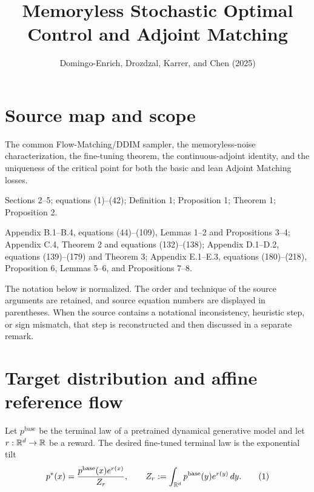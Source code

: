 
\title{Memoryless Stochastic Optimal Control and Adjoint Matching}
\author{}
\date{Domingo-Enrich, Drozdzal, Karrer, and Chen (2025)}

\maketitle

\section*{Source map and scope}
\begin{sourceguide}
\item[Primary source] {\scriptsize{}}
\item[Target results] The common Flow-Matching/DDIM sampler, the memoryless-noise characterization, the fine-tuning theorem, the continuous-adjoint identity, and the uniqueness of the critical point for both the basic and lean Adjoint Matching losses.
\item[Main-text anchors] Sections 2--5; equations (1)--(42); Definition 1; Proposition 1; Theorem 1; Proposition 2.
\item[Proof anchors] Appendix B.1--B.4, equations (44)--(109), Lemmas 1--2 and Propositions 3--4; Appendix C.4, Theorem 2 and equations (132)--(138); Appendix D.1--D.2, equations (139)--(179) and Theorem 3; Appendix E.1--E.3, equations (180)--(218), Proposition 6, Lemmas 5--6, and Propositions 7--8.
\end{sourceguide}

The notation below is normalized.  The order and technique of the source arguments are retained, and source equation numbers are displayed in parentheses.  When the source contains a notational inconsistency, heuristic step, or sign mismatch, that step is reconstructed and then discussed in a separate remark.

\section{Target distribution and affine reference flow}

Let $p^{\mathrm{base}}$ be the terminal law of a pretrained dynamical generative model and let $r:\mathbb{R}^d\to\mathbb{R}$ be a reward.  The desired fine-tuned terminal law is the exponential tilt
\begin{equation*}
 p^*(x)=\frac{p^{\mathrm{base}}(x)e^{r(x)}}{Z_r},
 \qquad
 Z_r:=\int_{\mathbb{R}^d}p^{\mathrm{base}}(y)e^{r(y)}\,dy.
 \tag{1}
\end{equation*}

